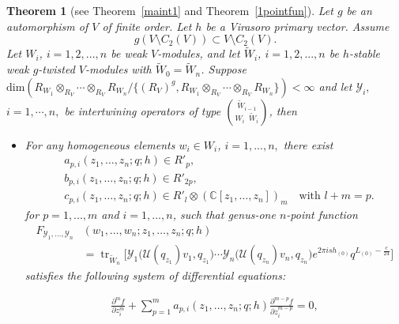 \documentclass[9pt]{amsart}
\newtheorem{theorem}{Theorem}[section]
\begin{document}
 
\begin{theorem}[see Theorem~\ref{maint1} and Theorem~\ref{1pointfun}]\label{1.2}
Let $g$ be an automorphism of $V$ of finite order. Let $h$ be a Virasoro primary vector. Assume \[g(V\setminus C_2(V))\subset V\setminus C_2(V).\] Let $W_i$, $i=1,2,...,n$ be weak $V$-modules, and let $\tilde{W}_i$, $i=1,2,...,n$ be $h$-stable weak $g$-twisted $V$-modules with $\tilde{W}_0=\tilde{W}_n$. Suppose $\text{dim}(R_{W_1}\otimes_{R_V} \cdots \otimes_{R_V} R_{W_n}/\{(R_V)^g,R_{W_1}\otimes_{R_V} \cdots \otimes_{R_V} R_{W_n}\})<\infty$ and let $\mathcal{Y}_{i},$ $i=1,\cdots,n,$ be intertwining operators of type $\displaystyle\binom{\tilde{W}_{i-1}}{W_{i}\;\; \tilde{W}_{i}}$, then
\begin{itemize}
    \item For any homogeneous elements $w_{i}\in W_{i}$, $i=1,...,n,$ there exist \begin{align*}
& a_{p,i}(z_{1}, \dots, z_{n}; q; h) \in R'_{p}, \\
& b_{p,i}(z_{1}, \dots, z_{n}; q; h) \in R'_{2p}, \\
& c_{p,i}(z_{1}, \dots, z_{n}; q; h) \in R'_{l} \otimes \left( \mathbb{C}[z_1, \dots, z_n] \right)_{m}
\quad \text{with } l + m = p.
\end{align*} for $p=1,...,m$ and $i=1,...,n$, such that genus-one $n$-point function 
\begin{align*}
F_{\mathcal{Y}_{1}, \dots, \mathcal{Y}_{n}}&(w_{1}, \dots, w_{n}; z_{1}, \dots, z_{n}; q; h) \\
&= \operatorname{tr}_{\tilde{W}_n} \Big[
\mathcal{Y}_1\big(\mathcal{U}(q_{z_{1}})v_{1}, q_{z_{1}}\big)
\cdots
\mathcal{Y}_n\big(\mathcal{U}(q_{z_{n}})v_{n}, q_{z_{n}}\big)
e^{2\pi i s h_{(0)}} q^{L_{(0)}-\frac{c}{24}}
\Big]
\end{align*}
satisfies the following system of differential equations:

\begin{align}\label{equatio1}
    \frac{\partial^m f}{\partial z_i^m}
    + \sum_{p=1}^m a_{p,i}(z_1, \dots, z_n; q; h) \frac{\partial^{m-p} f}{\partial z_i^{m-p}} = 0,
\end{align}


\end{itemize}
\end{theorem}
\end{document}
